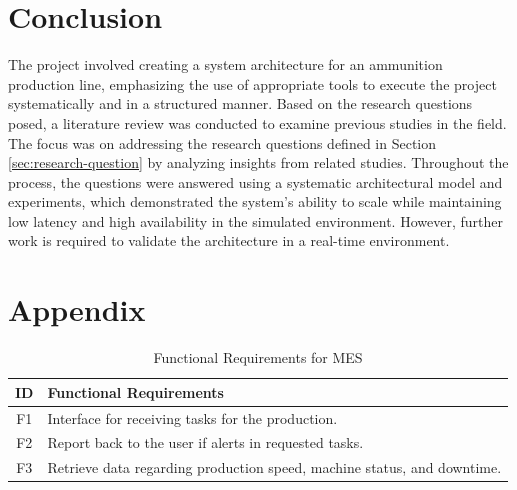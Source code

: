 



\section{Conclusion}
\label{sec:conclusion}

The project involved creating a system architecture for an ammunition production line, emphasizing the use of appropriate tools to execute the project systematically and in a structured manner. Based on the research questions posed, a literature review was conducted to examine previous studies in the field. The focus was on addressing the research questions defined in Section \ref{sec:research-question} by analyzing insights from related studies. Throughout the process, the questions were answered using a systematic architectural model and experiments, which demonstrated the system's ability to scale while maintaining low latency and high availability in the simulated environment. However, further work is required to validate the architecture in a real-time environment.





\newpage

\section{Appendix}
\label{sec:appendix}

\begin{table}[hbt]
    \centering
    \caption{Functional Requirements for MES}
    \label{tab:mes_functional}
    \begin{tabular}{|c|p{6cm}|}
        \hline
        \textbf{ID} & \textbf{Functional Requirements} \\
        \hline
        F1 & Interface for receiving tasks for the production. \\
        \hline
        F2 & Report back to the user if alerts in requested tasks. \\
        \hline
        F3 & Retrieve data regarding production speed, machine status, and downtime. \\
        \hline
    \end{tabular}
\end{table}

